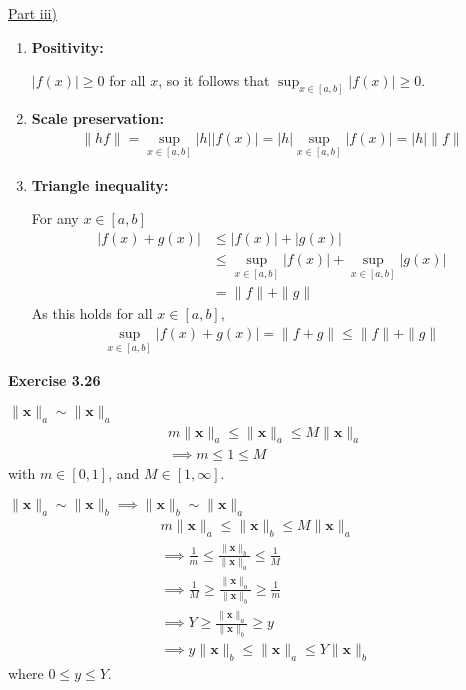 \documentclass[letterpaper,12pt]{article}
\newcommand{\vect}[1]{\mathbf{#1}}
\begin{document}
\underline{Part iii)}

\begin{enumerate}
  \item \textbf{Positivity:}
  
        $|f(x)| \geq 0$ for all $x$, so it follows that $\sup_{x \in [a, b]} |f(x)| \geq 0$.
  \item \textbf{Scale preservation:}
        \begin{align*}
          \|hf\| = \sup_{x \in [a, b]} |h||f(x)| = |h| \sup_{x \in [a, b]} |f(x)| = |h|\|f\|
        \end{align*}
  \item \textbf{Triangle inequality:}
  
        For any $x \in [a, b]$
        \begin{align*}
          |f(x) + g(x)| &\leq |f(x)| + |g(x)| \\
                        &\leq \sup_{x \in [a, b]} |f(x)| + \sup_{x \in [a, b]} |g(x)| \\
                        &= \|f\| + \|g\|
        \end{align*}
        As this holds for all $x \in [a, b]$,
        \begin{align*}
          \sup_{x \in [a, b]} |f(x) + g(x)| = \|f + g \| \leq \|f\| + \|g\|
        \end{align*}
\end{enumerate}

\textbf{Exercise 3.26}

\underline{$\| \vect{x} \|_a \sim \| \vect{x} \|_a$}
\begin{align*}
  & m \| \vect{x} \|_a \leq \|\vect{x}\|_a \leq M \| \vect{x} \|_a
  \\
  & \implies m \leq 1 \leq M
\end{align*}
with $m \in [0, 1]$, and $M \in [1, \infty]$.

\underline{$ \| \vect{x} \|_a \sim \| \vect{x} \|_b \implies \| \vect{x} \|_b \sim \| \vect{x} \|_a$}
\begin{align*}
  & m \| \vect{x} \|_a \leq \|\vect{x}\|_b \leq M \| \vect{x} \|_a
  \\
  & \implies \frac{1}{m} \leq \frac{\|\vect{x}\|_b}{\| \vect{x} \|_a } \leq \frac{1}{M} \\
  & \implies \frac{1}{M} \geq \frac{\|\vect{x}\|_a}{\| \vect{x} \|_b } \geq \frac{1}{m} \\
  & \implies Y \geq \frac{\|\vect{x}\|_a}{\| \vect{x} \|_b } \geq y \\
  & \implies y \| \vect{x} \|_b  \leq \|\vect{x}\|_a \leq Y \| \vect{x} \|_b 
\end{align*}
where $0 \leq y \leq Y$.
\end{document}
